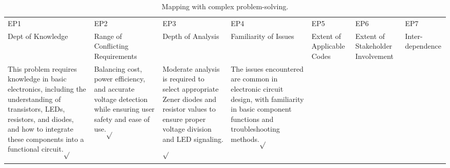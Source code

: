     \begin{table}[ht]
        \centering
        \caption{Mapping with complex problem-solving.}
        \begin{tabular}{|p{}|p{}|p{}|p{}|p{}|p{}|p{}|}
        \hline
        EP1& EP2& EP3& EP4& EP5& EP6& EP7\\
        Dept of Knowledge & Range of Conflicting Requirements & Depth of Analysis & Familiarity of Issues & Extent of Applicable Codes & Extent of Stakeholder Involvement & Inter-dependence\\
        \hline 
        This problem requires knowledge in basic electronics, including the understanding of transistors, LEDs, resistors, and diodes, and how to integrate these components into a functional circuit.\newline $\sqrt{}$ & Balancing cost, power efficiency, and accurate voltage detection while ensuring user safety and ease of use.\newline $\sqrt{}$ & Moderate analysis is required to select appropriate Zener diodes and resistor values to ensure proper voltage division and LED signaling.\newline $\sqrt{}$ & The issues encountered are common in electronic circuit design, with familiarity in basic component functions and troubleshooting methods.\newline $\sqrt{}$
        &&&\\
        &&&&&&\\
        \hline 
        \end{tabular}
        \label{tab:p_solve}
    \end{table}


\pagebreak
